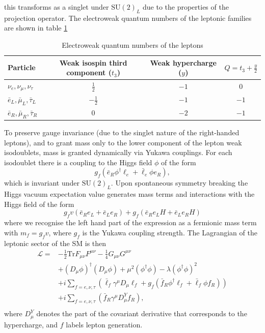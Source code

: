 this transforms as a singlet under $\mathrm{SU}(2)_{L}$ due to the properties of the projection operator. The electroweak quantum numbers of the leptonic families are shown in table \ref{tab:theory:elecroweak_qn_leptons}
\begin{table}[h!]
\begin{tabular}{ l | c | c | c }
    Particle & Weak isospin third component ($t_{3}$) & Weak hypercharge ($y$) & $Q = t_3 + \frac{y}{2}$ \\
    \hline
    $\nu_{e},\nu_{\mu},\nu_{\tau}$  & $\frac{1}{2} $ & $-1$ & $0$ \\
    $\bar{e}_{L},\bar{\mu}_{L},\bar{\tau}_{L}$  & $-\frac{1}{2} $ & $-1$ & $-1$ \\
    $\bar{e}_{R},\bar{\mu}_{R},\bar{\tau}_{R}$  & $0$  & $-2$ & $-1$ \\
\end{tabular}
\caption{Electroweak quantum numbers of the leptons}
 \label{tab:theory:elecroweak_qn_leptons}
\end{table}

To preserve gauge invariance (due to the singlet nature of the right-handed leptons), and to grant mass only to the lower component of the lepton weak isodoublets, mass is granted dynamically via Yukawa couplings. For each isodoublet there is a coupling to the Higgs field $\phi$ of the form
\begin{equation}
    \label{eq:theory:lepton_yukawa}
    g_{f}(\bar{e}_{R}\phi^{\dag}\ell_{e} + \bar{\ell}_{e}\phi{e}_{R}),
\end{equation}
which is invariant under $\mathrm{SU}(2)_{L}$. Upon spontaneous symmetry breaking the Higgs vacuum expectation value generates mass terms and interactions with the Higgs field of the form
\begin{equation}
    \label{eq:theory:lepton_mass_higgs_int}
    g_{f}v(\bar{e}_{R}e_{L} + \bar{e}_{L}e_{R}) + g_{f}(\bar{e}_{R}e_{L}H + \bar{e}_{L}e_{R}H)
\end{equation}
where we recognise the left hand part of the expression as a fermionic mass term with $m_{f} = g_{f}v$, where $g_f$ is the Yukawa coupling strength. The Lagrangian of the leptonic sector of the SM is then
\begin{equation}
    \begin{split}
    \mathcal{L} =& -\frac{1}{2}\mathrm{Tr}F_{\mu\nu}F^{\mu\nu} - \frac{1}{4}G_{\mu\nu}G^{\mu\nu} \\
                 &+ (D_{\mu}\phi)^{\dag}(D_{\mu}\phi) + \mu^{2}(\phi^{\dag}\phi) - \lambda(\phi^{\dag}\phi)^{2} \\
                 &+ i\sum_{f=e,\nu,\tau}(\bar{\ell}_{f}\gamma^{\mu}D_{\mu}\ell_{f} + g_{f}(\bar{f}_{R}\phi^{\dag}\ell_{f} + \bar{\ell}_{f}\phi{f}_{R})) \\
                 &+ i\sum_{f=e,\nu,\tau}(\bar{f}_{R}\gamma^{\mu}D^{Y}_{\mu}f_{R}), \\
    \end{split}
\end{equation}
where $D^{Y}_{\mu}$ denotes the part of the covariant derivative that corresponds to the hypercharge, and $f$ labels lepton generation. 

